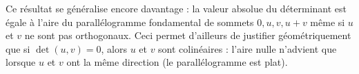 {\begin{center}
	\end{center}
	
	Ce résultat se généralise encore davantage : la valeur absolue du déterminant est égale à l'aire du parallélogramme fondamental de sommets $0, u, v, u+v$ même si $u$ et $v$ ne sont pas orthogonaux.
	Ceci permet d'ailleurs de justifier géométriquement que si $\det(u,v) = 0$, alors $u$ et $v$ sont colinéaires : l'aire nulle n'advient que lorsque $u$ et $v$ ont la même direction (le parallélogramme est plat).
}


%


\newpage
{}
\shipoutAnswer


